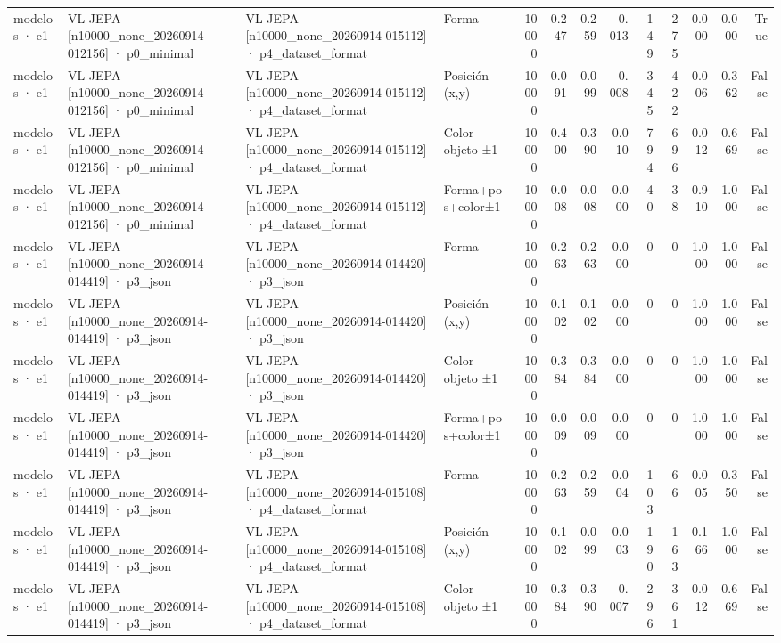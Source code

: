 \begin{tabular}{llllrrrrrrrrr}
modelos · e1 & VL-JEPA [n10000\_none\_20260914-012156] · p0\_minimal & VL-JEPA [n10000\_none\_20260914-015112] · p4\_dataset\_format & Forma & 10000 & 0.247 & 0.259 & -0.013 & 149 & 275 & 0.000 & 0.000 & True \\
modelos · e1 & VL-JEPA [n10000\_none\_20260914-012156] · p0\_minimal & VL-JEPA [n10000\_none\_20260914-015112] · p4\_dataset\_format & Posición (x,y) & 10000 & 0.091 & 0.099 & -0.008 & 345 & 422 & 0.006 & 0.362 & False \\
modelos · e1 & VL-JEPA [n10000\_none\_20260914-012156] · p0\_minimal & VL-JEPA [n10000\_none\_20260914-015112] · p4\_dataset\_format & Color objeto ±1 & 10000 & 0.400 & 0.390 & 0.010 & 794 & 696 & 0.012 & 0.669 & False \\
modelos · e1 & VL-JEPA [n10000\_none\_20260914-012156] · p0\_minimal & VL-JEPA [n10000\_none\_20260914-015112] · p4\_dataset\_format & Forma+pos+color±1 & 10000 & 0.008 & 0.008 & 0.000 & 40 & 38 & 0.910 & 1.000 & False \\
modelos · e1 & VL-JEPA [n10000\_none\_20260914-014419] · p3\_json & VL-JEPA [n10000\_none\_20260914-014420] · p3\_json & Forma & 10000 & 0.263 & 0.263 & 0.000 & 0 & 0 & 1.000 & 1.000 & False \\
modelos · e1 & VL-JEPA [n10000\_none\_20260914-014419] · p3\_json & VL-JEPA [n10000\_none\_20260914-014420] · p3\_json & Posición (x,y) & 10000 & 0.102 & 0.102 & 0.000 & 0 & 0 & 1.000 & 1.000 & False \\
modelos · e1 & VL-JEPA [n10000\_none\_20260914-014419] · p3\_json & VL-JEPA [n10000\_none\_20260914-014420] · p3\_json & Color objeto ±1 & 10000 & 0.384 & 0.384 & 0.000 & 0 & 0 & 1.000 & 1.000 & False \\
modelos · e1 & VL-JEPA [n10000\_none\_20260914-014419] · p3\_json & VL-JEPA [n10000\_none\_20260914-014420] · p3\_json & Forma+pos+color±1 & 10000 & 0.009 & 0.009 & 0.000 & 0 & 0 & 1.000 & 1.000 & False \\
modelos · e1 & VL-JEPA [n10000\_none\_20260914-014419] · p3\_json & VL-JEPA [n10000\_none\_20260914-015108] · p4\_dataset\_format & Forma & 10000 & 0.263 & 0.259 & 0.004 & 103 & 66 & 0.005 & 0.350 & False \\
modelos · e1 & VL-JEPA [n10000\_none\_20260914-014419] · p3\_json & VL-JEPA [n10000\_none\_20260914-015108] · p4\_dataset\_format & Posición (x,y) & 10000 & 0.102 & 0.099 & 0.003 & 190 & 163 & 0.166 & 1.000 & False \\
modelos · e1 & VL-JEPA [n10000\_none\_20260914-014419] · p3\_json & VL-JEPA [n10000\_none\_20260914-015108] · p4\_dataset\_format & Color objeto ±1 & 10000 & 0.384 & 0.390 & -0.007 & 296 & 361 & 0.012 & 0.669 & False \\

\end{tabular}
